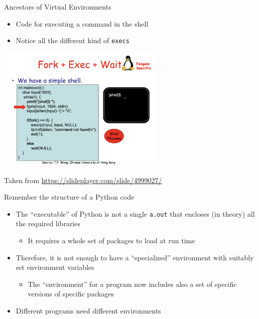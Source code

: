 \documentclass{beamer}
\begin{document}
\begin{frame}
{\centerline{Ancestors of Virtual Environments}}
\begin{itemize}
    \item Code for executing a command in the shell
    \item Notice all the different kind of \texttt{execs}
\end{itemize} 
\begin{center}
    \includegraphics[width=0.6\textwidth]{Coding/forkExec.jpg}
\end{center}

\begin{center}
    \tiny{Taken from \url{https://slideplayer.com/slide/4999027/}}
\end{center}


\end{frame}

\begin{frame}
{\centerline{Remember the structure of a Python code}}
\begin{itemize}
    \item The ``executable'' of Python is not a single \texttt{a.out} that encloses (in theory) all the required libraries
    \begin{itemize}
    \item It requires a whole set of packages to load at run time
\end{itemize} 
    \item Therefore, it is not enough to have a ``specialized'' environment with suitably set environment variables
    \begin{itemize}
        \item The ``environment'' for a program now includes also a set of specific versions of specific packages
    \end{itemize} 
    \item Different programs need different environments
\end{itemize} 

\end{frame}
\end{document}
